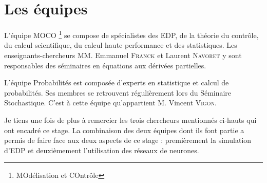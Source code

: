 \section{Les équipes}

L'équipe MOCO \footnote{MOdélisation et COntrôle} se compose de spécialistes des EDP, de la théorie du contrôle, du calcul scientifique, du calcul haute performance et des statistiques. Les enseignants-chercheurs MM. Emmanuel \textsc{Franck} et Laurent \textsc{Navoret} y sont responsables des séminaires en équations aux dérivées partielles. 

L'équipe Probabilités est composée d'experts en statistique et calcul de probabilités. Ses membres se retrouvent régulièrement lors du Séminaire Stochastique. C'est à cette équipe qu'appartient M. Vincent \textsc{Vigon}. 

Je tiens une fois de plus à remercier les trois chercheurs mentionnés ci-hauts qui ont encadré ce stage. La combinaison des deux équipes dont ils font partie a permis de faire face aux deux aspects de ce stage : premièrement la simulation d'EDP et deuxièmement l'utilisation des réseaux de neurones.


